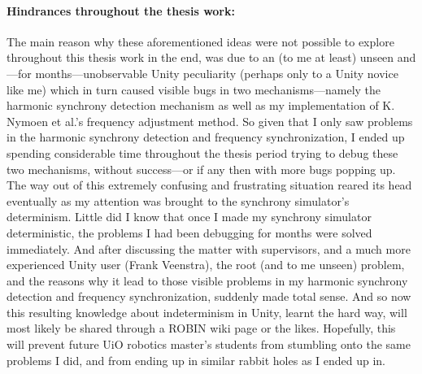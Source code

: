 	\paragraph{Hindrances throughout the thesis work:}
	The main reason why these aforementioned ideas were not possible to explore throughout this thesis work in the end, was due to an (to me at least) unseen and—for months—unobservable Unity peculiarity (perhaps only to a Unity novice like me) which in turn caused visible bugs in two mechanisms—namely the harmonic synchrony detection mechanism as well as my implementation of K. Nymoen et al.'s frequency adjustment method. So given that I only saw problems in the harmonic synchrony detection and frequency synchronization, I ended up spending considerable time throughout the thesis period trying to debug these two mechanisms, without success—or if any then with more bugs popping up. The way out of this extremely confusing and frustrating situation reared its head eventually as my attention was brought to the synchrony simulator's determinism. Little did I know that once I made my synchrony simulator deterministic, the problems I had been debugging for months were solved immediately. And after discussing the matter with supervisors, and a much more experienced Unity user (Frank Veenstra), the root (and to me unseen) problem, and the reasons why it lead to those visible problems in my harmonic synchrony detection and frequency synchronization, suddenly made total sense. And so now this resulting knowledge about indeterminism in Unity, learnt the hard way, will most likely be shared through a ROBIN wiki page or the likes. Hopefully, this will prevent future UiO robotics master's students from stumbling onto the same problems I did, and from ending up in similar rabbit holes as I ended up in.